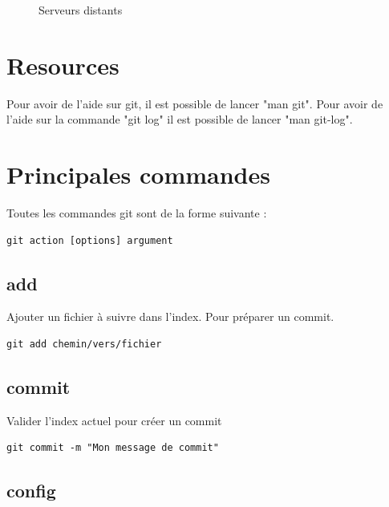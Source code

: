 \documentclass[a4paper]{article}
\begin{document}
\begin{figure}[h]
  \center
  \caption{Serveurs distants}
\end{figure}

\section*{Resources}
Pour avoir de l'aide sur git, il est possible de lancer "man git". Pour
avoir de l'aide sur la commande "git log" il est possible de lancer "man
git-log".

\section*{Principales commandes}

Toutes les commandes git sont de la forme suivante : 
\begin{verbatim}
git action [options] argument
\end{verbatim}

\subsection*{add}
Ajouter un fichier à suivre dans l'index. Pour préparer un commit.
\begin{verbatim}
git add chemin/vers/fichier
\end{verbatim}

\subsection*{commit}
Valider l'index actuel pour créer un commit
\begin{verbatim}
git commit -m "Mon message de commit"
\end{verbatim}

\subsection*{config}
\end{document}
